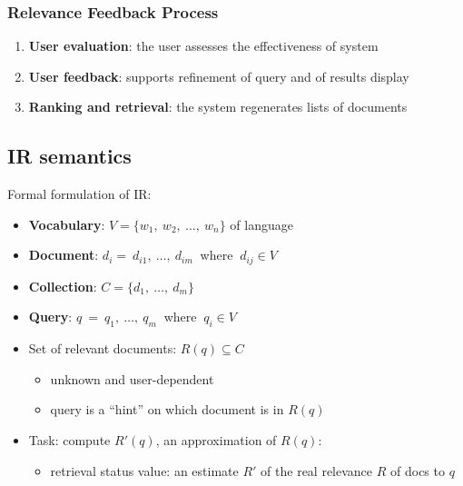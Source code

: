 \documentclass{article}
\begin{document}
\subsubsection{Relevance Feedback Process}
\begin{enumerate}
    \item \textbf{User evaluation}: the user assesses the effectiveness of system
    \item \textbf{User feedback}: supports refinement of query and of results display
    \item \textbf{Ranking and retrieval}: the system regenerates lists of documents
\end{enumerate}
\subsection{IR semantics}
Formal formulation of IR:
\begin{itemize}
    \item \textbf{Vocabulary}: $ V = \{w_1, \ w_2, \ \dots, \ w_n\} $ of language
    \item \textbf{Document}: $ d_i = \ d_{i1}, \ \dots, \ d_{im} \ $ where $ \ d_{ij} \in V $
    \item \textbf{Collection}: $ C = \{d_1, \ \dots, \ d_m\} $
    \item \textbf{Query}: $ q \ = \ q_1, \ \dots, \ q_m \ $ where $ \ q_i \in V $
    \item Set of relevant documents: $ R(q) \subseteq C $
    \begin{itemize}
        \item unknown and user-dependent
        \item query is a “hint” on which document is in $ R(q) $
    \end{itemize}
    \item Task: compute $ R'(q) $, an approximation of $ R(q) $:
    \begin{itemize}
        \item retrieval status value: an estimate $ R' $ of the real relevance $ R $ of docs to $ q $ \\
    \end{itemize}
\end{itemize}
\end{document}
